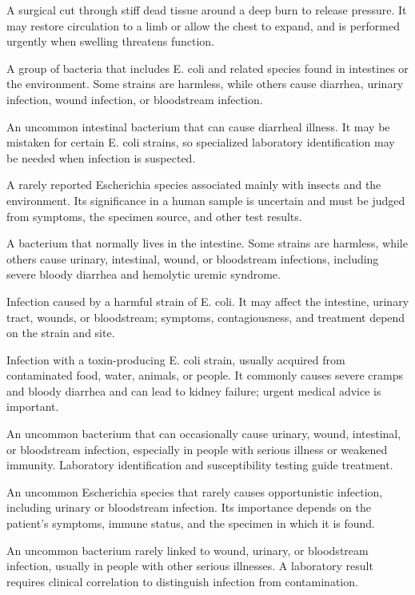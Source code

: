  A surgical cut through stiff dead tissue around a deep burn to release pressure. It may restore circulation to a limb or allow the chest to expand, and is performed urgently when swelling threatens function.

 A group of bacteria that includes E. coli and related species found in intestines or the environment. Some strains are harmless, while others cause diarrhea, urinary infection, wound infection, or bloodstream infection.

 An uncommon intestinal bacterium that can cause diarrheal illness. It may be mistaken for certain E. coli strains, so specialized laboratory identification may be needed when infection is suspected.

 A rarely reported Escherichia species associated mainly with insects and the environment. Its significance in a human sample is uncertain and must be judged from symptoms, the specimen source, and other test results.

 A bacterium that normally lives in the intestine. Some strains are harmless, while others cause urinary, intestinal, wound, or bloodstream infections, including severe bloody diarrhea and hemolytic uremic syndrome.

 Infection caused by a harmful strain of E. coli. It may affect the intestine, urinary tract, wounds, or bloodstream; symptoms, contagiousness, and treatment depend on the strain and site.

 Infection with a toxin-producing E. coli strain, usually acquired from contaminated food, water, animals, or people. It commonly causes severe cramps and bloody diarrhea and can lead to kidney failure; urgent medical advice is important.

 An uncommon bacterium that can occasionally cause urinary, wound, intestinal, or bloodstream infection, especially in people with serious illness or weakened immunity. Laboratory identification and susceptibility testing guide treatment.

 An uncommon Escherichia species that rarely causes opportunistic infection, including urinary or bloodstream infection. Its importance depends on the patient’s symptoms, immune status, and the specimen in which it is found.

 An uncommon bacterium rarely linked to wound, urinary, or bloodstream infection, usually in people with other serious illnesses. A laboratory result requires clinical correlation to distinguish infection from contamination.

